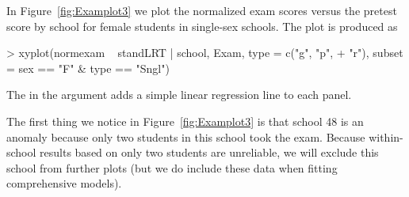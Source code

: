 \documentclass[12pt]{article}
\begin{document}
In Figure~\ref{fig:Examplot3} we plot the normalized exam scores
versus the pretest score by school for female students in single-sex
schools.  The plot is produced as
\begin{Schunk}
\begin{Sinput}
> xyplot(normexam ~ standLRT | school, Exam, type = c("g", "p", 
+     "r"), subset = sex == "F" & type == "Sngl")
\end{Sinput}
\end{Schunk}
The  in the  argument adds a simple linear
regression line to each panel.

The first thing we notice in Figure~\ref{fig:Examplot3} is that
school 48 is an anomaly because only two students in this school took
the exam.  Because within-school results based on only two students
are unreliable, we will exclude this school from further plots (but we
do include these data when fitting comprehensive models).
\end{document}
